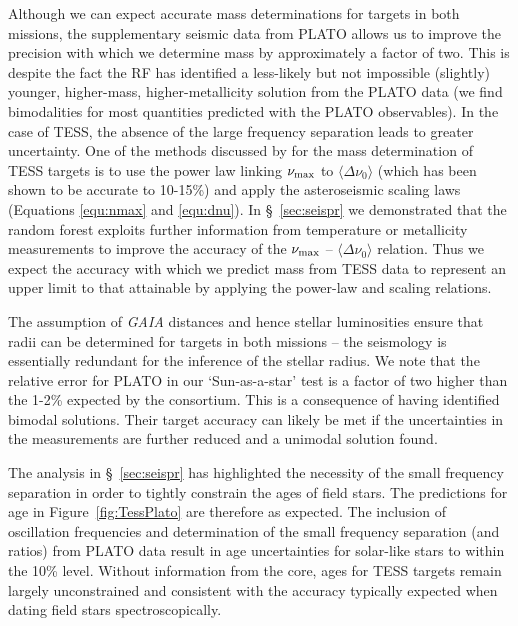 Although we can expect accurate mass determinations for targets in both missions, the supplementary seismic data from PLATO allows us to improve the precision with which we determine mass by approximately a factor of two. This is despite the fact the RF has identified a less-likely but not impossible (slightly) younger, higher-mass, higher-metallicity solution from the  PLATO  data (we find bimodalities for most quantities predicted with the PLATO observables). In the case of TESS, the absence of the large frequency separation leads to greater uncertainty. One of the methods discussed  by \citet{2016ApJ...830..138C} for the mass determination of TESS targets is to use the power law linking $\nu_{\rm{max}}$ to $\langle\Delta\nu_0\rangle$ (which has been shown to be accurate to 10-15\%) and apply the asteroseismic scaling laws (Equations \ref{equ:nmax} and \ref{equ:dnu}).  In \S~\ref{sec:seispr} we demonstrated that the random forest exploits further information from  temperature or metallicity measurements to improve the accuracy of the $\nu_{\rm{max}}$ -- $\langle\Delta\nu_0\rangle$ relation.  Thus we expect the accuracy with which we predict mass from TESS data to represent an upper limit to that attainable by  applying the power-law and scaling relations. 

The assumption of \emph{GAIA} distances and hence stellar luminosities ensure that radii can be determined for targets in both missions -- the seismology is essentially redundant for the inference of the stellar radius.  We note that the relative error for  PLATO in our `Sun-as-a-star' test  is a factor of two higher than the 1-2\% expected by the consortium. This is a consequence of having identified bimodal solutions. Their target accuracy can likely be met if the uncertainties in the measurements are further reduced and a unimodal solution found. 

The analysis in \S~\ref{sec:seispr} has highlighted the necessity of the small frequency separation  in order to 
tightly constrain the ages of field stars. The predictions for age in Figure~\ref{fig:TessPlato} are therefore as expected. 
The inclusion of oscillation frequencies and determination of the small frequency separation (and ratios) from PLATO data result in age uncertainties for solar-like stars to within the 10\% level.  Without information from the core, ages for TESS targets remain largely unconstrained and consistent with the accuracy typically expected when dating field stars spectroscopically. 




